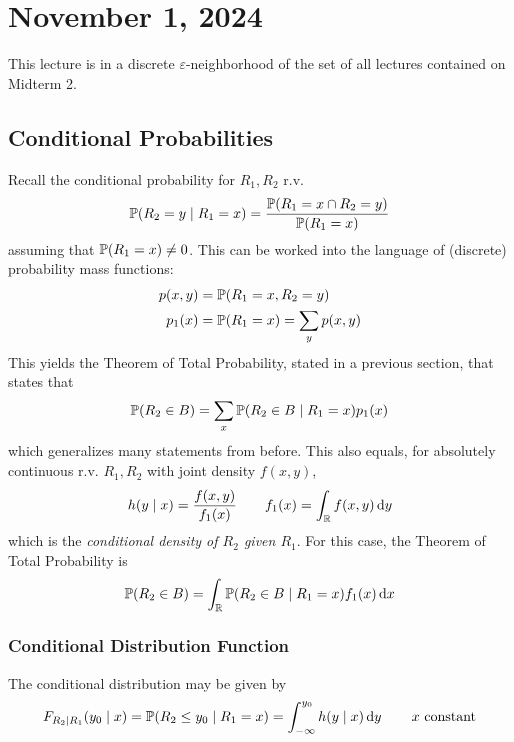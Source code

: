 \section{November 1, 2024}
This lecture is in a discrete $\varepsilon$-neighborhood of the set of all lectures contained on Midterm 2.

\subsection{Conditional Probabilities}
Recall the conditional probability for $R_1,R_2$ r.v.
\begin{align}
    \mathbb{P}(R_2 = y \mid R_1 = x) = \frac{\mathbb{P}(R_1 = x \cap R_2 = y)}{\mathbb{P}(R_1 = x)}
\end{align}
assuming that $\mathbb{P}(R_1 = x) \ne 0$. This can be worked into the language of (discrete) probability mass functions:
\begin{align}
    p(x,y) &= \mathbb{P}(R_1 = x, R_2 = y)\\
    p_1(x) &= \mathbb{P}(R_1 = x) = \sum_y p(x,y)
\end{align}
This yields the Theorem of Total Probability, stated in a previous section, that states that
\begin{align}
    \mathbb{P}(R_2 \in B) = \sum_{x} \mathbb{P}(R_2 \in B \mid R_1 = x) p_1(x)
\end{align}
which generalizes many statements from before. This also equals, for absolutely continuous r.v. $R_1,R_2$ with joint density $f(x,y)$,
\begin{align}
    h(y \mid x) = \frac{f(x,y)}{f_1(x)} \qsp f_1(x) = \int_\real f(x,y) \dd{y} %
\end{align}
which is the \textit{conditional density of $R_2$ given $R_1$}. For this case, the Theorem of Total Probability is
\begin{align}
    \mathbb{P}(R_2 \in B) = \int_{\mathbb{R}} \mathbb{P}(R_2 \in B \mid R_1 = x) f_1(x) \dd{x}
\end{align}

\subsubsection{Conditional Distribution Function}
The conditional distribution may be given by
\begin{align*}
    F_{R_2 \mid R_1}(y_0 \mid x) = \probability(R_2 \le y_0 \mid R_1 = x) = \int_{-\infty}^{y_0} h(y \mid x) \dd{y} \qsp \text{$x$ constant}
\end{align*}


